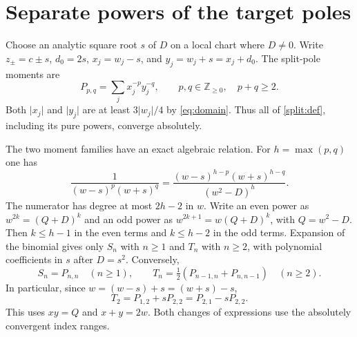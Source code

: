 \section{Separate powers of the target poles}
\label{sec:split}

Choose an analytic square root \(s\) of \(D\) on a local chart where
\(D\ne0\). Write \(z_\pm=c\pm s\), \(d_0=2s\), \(x_j=w_j-s\), and
\(y_j=w_j+s=x_j+d_0\). The split-pole moments are
\begin{equation}
 P_{p,q}=\sum_j x_j^{-p}y_j^{-q},
 \qquad p,q\in\mathbb Z_{\geq0},\quad p+q\geq2.
 \label{split:def}
\end{equation}
Both \(\lvert x_j\rvert\) and \(\lvert y_j\rvert\) are at least
\(3\lvert w_j\rvert/4\) by \eqref{eq:domain}. Thus all of
\eqref{split:def}, including its pure powers, converge absolutely.

The two moment families have an exact algebraic relation.
For \(h=\max(p,q)\) one has
\begin{equation}
 \frac1{(w-s)^p(w+s)^q}
    =\frac{(w-s)^{h-p}(w+s)^{h-q}}{(w^2-D)^h}.
 \label{split:reduction}
\end{equation}
The numerator has degree at most \(2h-2\) in \(w\).
Write an even power as \(w^{2k}=(Q+D)^k\) and an odd power as
\(w^{2k+1}=w(Q+D)^k\), with \(Q=w^2-D\).
Then \(k\leq h-1\) in the even terms and \(k\leq h-2\) in the
odd terms. Expansion of the binomial gives only \(S_n\) with
\(n\geq1\) and \(T_n\) with \(n\geq2\), with polynomial
coefficients in \(s\) after \(D=s^2\). Conversely,
\begin{equation}
 S_n=P_{n,n}\quad(n\geq1),\qquad
 T_n=\tfrac12(P_{n-1,n}+P_{n,n-1})\quad(n\geq2).
 \label{split:inverse}
\end{equation}
In particular, since $w=(w-s)+s=(w+s)-s$,
\begin{equation}
 T_2=P_{1,2}+sP_{2,2}=P_{2,1}-sP_{2,2}.
 \label{split:T2}
\end{equation}
This uses \(xy=Q\) and \(x+y=2w\). Both changes of expressions
use the absolutely convergent index ranges.

